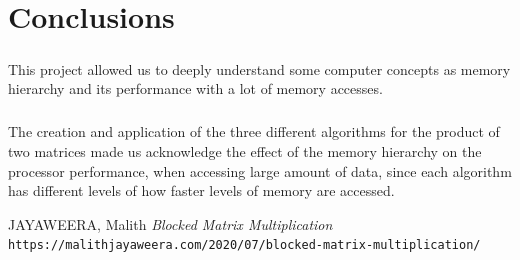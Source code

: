 \documentclass{report}
\begin{document}
	\chapter{Conclusions}
	        
	        \paragraph{}This project allowed us to deeply understand some computer concepts as memory hierarchy and its performance with a lot of memory accesses.
	        
	        \paragraph{}The creation and application of the three different algorithms for the product of two matrices made us acknowledge the effect of the memory hierarchy on the processor performance, when accessing large amount of data, since each algorithm has different levels of how faster levels of memory are accessed.
	
	\begin{thebibliography}{1}
		JAYAWEERA, Malith \textit{Blocked Matrix Multiplication}
		\\\texttt{https://malithjayaweera.com/2020/07/blocked-matrix-multiplication/}
	\end{thebibliography}
	
\end{document}

